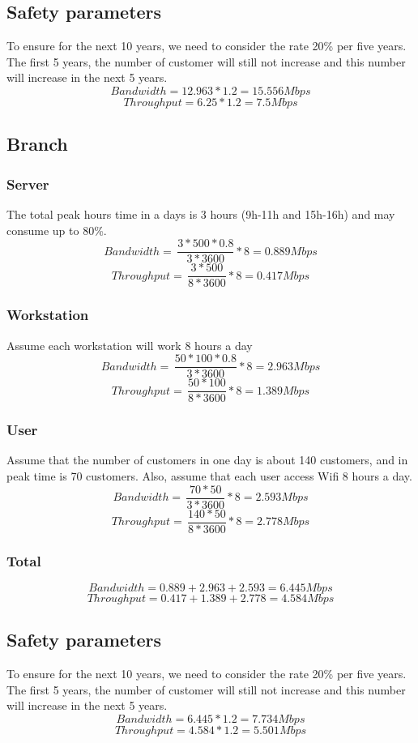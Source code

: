 \subsection{Safety parameters}
To ensure for the next 10 years, we need to consider the rate 20\% per five years. The first 5 years, the number of customer will still not increase and this number will increase in the next 5 years.
$$Bandwidth = 12.963*1.2 = 15.556Mbps$$
$$Throughput =6.25*1.2 = 7.5Mbps$$

\subsection{Branch}
\subsubsection{Server}
The total peak hours time in a days is 3 hours (9h-11h and 15h-16h) and may consume up to 80\%. \\
$$Bandwidth = \, \frac{3*500*0.8}{3*3600}*8 = 0.889Mbps$$
$$Throughput = \, \frac{3*500}{8*3600}*8 = 0.417Mbps$$
\subsubsection{Workstation}
Assume each workstation will work 8 hours a day
$$Bandwidth = \, \frac{50*100*0.8}{3*3600}*8 = 2.963Mbps$$
$$Throughput = \, \frac{50*100}{8*3600}*8 = 1.389Mbps$$
\subsubsection{User}
Assume that the number of customers in one day is about 140 customers, and in peak
time is 70 customers. Also, assume that each user access Wifi 8 hours a day.
$$Bandwidth = \, \frac{70*50}{3*3600}*8 = 2.593Mbps$$
$$Throughput = \, \frac{140*50}{8*3600}*8 = 2.778Mbps$$

\subsubsection{Total}
$$Bandwidth = 0.889+2.963+2.593= 6.445Mbps$$
$$Throughput =0.417+1.389+2.778= 4.584Mbps$$

\subsection{Safety parameters}
To ensure for the next 10 years, we need to consider the rate 20\% per five years. The first 5 years, the number of customer will still not increase and this number will increase in the next 5 years.
$$Bandwidth = 6.445*1.2 = 7.734Mbps$$
$$Throughput =4.584*1.2 = 5.501Mbps$$

